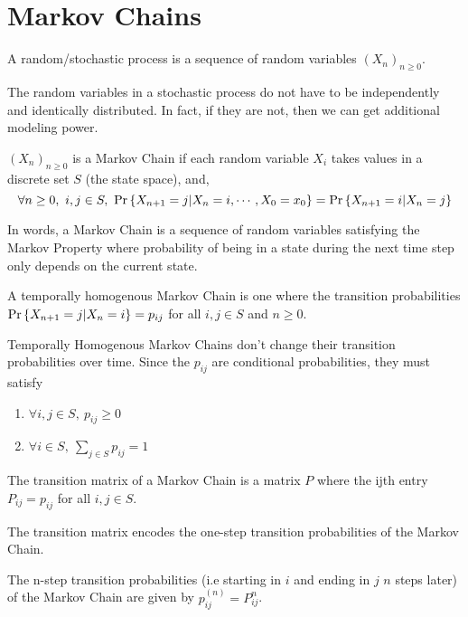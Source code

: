 \section{Markov Chains}
\begin{definition}
	A random/stochastic process is a sequence of random variables $(X_n)_{n\geq 0}$.
	\label{defn:random-process}
\end{definition}
The random variables in a stochastic process do not have to be independently and identically distributed.
In fact, if they are not, then we can get additional modeling power.
\begin{definition}
	$(X_n)_{n\geq 0}$ is a Markov Chain if each random variable $X_i$ takes values in a discrete set $S$ (the state space), and, \[
		\forall n \geq 0,\ i,j\in S,\ \pr{X_{n+1}=j|X_n=i,\cdots,X_0=x_0} = \pr{X_{n+1}=i|X_n=j}
	\]
	\label{defn:markov-chain}
\end{definition}
In words, a Markov Chain is a sequence of random variables satisfying the Markov Property where probability of being in a state during the next time step only depends on the current state.
\begin{definition}
	A temporally homogenous Markov Chain is one where the transition probabilities $\text{Pr}\left\{X_{n+1}=j|X_n=i\right\} = p_{ij}$ for all $i,j\in S$ and $n\geq 0$.
	\label{defn:temp-homo-markov-chain}
\end{definition}
Temporally Homogenous Markov Chains don't change their transition probabilities over time.
Since the $p_{ij}$ are conditional probabilities, they must satisfy
\begin{enumerate}
	\item $\forall i,j\in S,\ p_{ij} \geq 0$
	\item $\forall i\in S,\ \sum_{j\in S}p_{ij} = 1$
\end{enumerate}
\begin{definition}
	The transition matrix of a Markov Chain is a matrix $P$ where the ijth entry $P_{ij} = p_{ij}$ for all $i,j\in S$.
	\label{defn:transition-mat}
\end{definition}
The transition matrix encodes the one-step transition probabilities of the Markov Chain.
\begin{theorem}
	The n-step transition probabilities (i.e starting in $i$ and ending in $j$ $n$ steps later) of the Markov Chain are given by $p_{ij}^{(n)} = P^n_{ij}$.
	\label{thm:chapman-kolmogorov}
\end{theorem}
